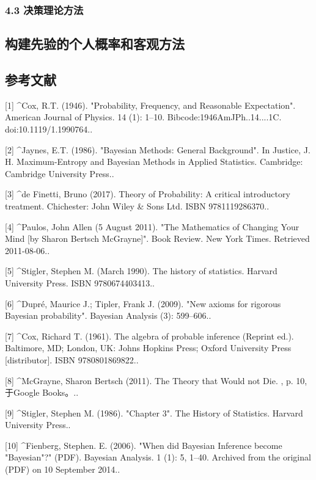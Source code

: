 \subsubsection{4.3 决策理论方法}



\subsection{构建先验的个人概率和客观方法}



\subsection{参考文献}

[1]
^Cox, R.T. (1946). "Probability, Frequency, and Reasonable Expectation". American Journal of Physics. 14 (1): 1–10. Bibcode:1946AmJPh..14....1C. doi:10.1119/1.1990764..

[2]
^Jaynes, E.T. (1986). "Bayesian Methods: General Background". In Justice, J. H. Maximum-Entropy and Bayesian Methods in Applied Statistics. Cambridge: Cambridge University Press..

[3]
^de Finetti, Bruno (2017). Theory of Probability: A critical introductory treatment. Chichester: John Wiley & Sons Ltd. ISBN 9781119286370..

[4]
^Paulos, John Allen (5 August 2011). "The Mathematics of Changing Your Mind [by Sharon Bertsch McGrayne]". Book Review. New York Times. Retrieved 2011-08-06..

[5]
^Stigler, Stephen M. (March 1990). The history of statistics. Harvard University Press. ISBN 9780674403413..

[6]
^Dupré, Maurice J.; Tipler, Frank J. (2009). "New axioms for rigorous Bayesian probability". Bayesian Analysis (3): 599–606..

[7]
^Cox, Richard T. (1961). The algebra of probable inference (Reprint ed.). Baltimore, MD; London, UK: Johns Hopkins Press; Oxford University Press [distributor]. ISBN 9780801869822..

[8]
^McGrayne, Sharon Bertsch (2011). The Theory that Would not Die. , p. 10,于Google Books。..

[9]
^Stigler, Stephen M. (1986). "Chapter 3". The History of Statistics. Harvard University Press..

[10]
^Fienberg, Stephen. E. (2006). "When did Bayesian Inference become "Bayesian"?" (PDF). Bayesian Analysis. 1 (1): 5, 1–40. Archived from the original (PDF) on 10 September 2014..

